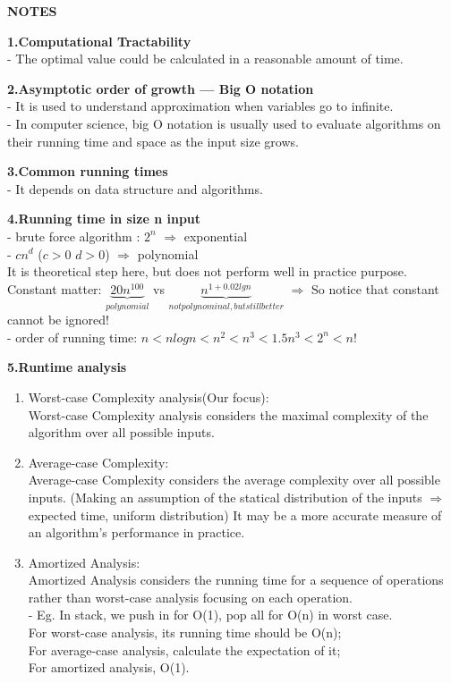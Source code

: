 \setlength{\parindent}{4em}
\setlength{\parskip}{1em}
\renewcommand{\baselinestretch}{1}
 
\textbf{NOTES}

\textbf{1.Computational Tractability} \\
- The optimal value could be calculated in a reasonable amount of time.

\textbf{2.Asymptotic order of growth --- Big O notation} \\
- It is used to understand approximation when variables go to infinite. \\
- In computer science, big O notation is usually used to evaluate algorithms on their running time and space as the input size grows.

\textbf{3.Common running times} \\
- It depends on data structure and algorithms.

\textbf{4.Running time in size n input} \\
- brute force algorithm : $2^{n}$ $\Rightarrow$ exponential \\
- $c n^{d}$ ($c>0$ $d>0$) $\Rightarrow$ polynomial\\
It is theoretical step here, but does not perform well in practice purpose. \\ 
Constant matter: $\underbrace{20 n^{100}}_{polynomial}$ vs $\underbrace{n^{1+0.02 lgn}}_{not polynominal, but still better}$ $\Rightarrow$ So notice that constant cannot be ignored! \\
- order of running time: $n<nlogn<n^{2}<n^{3}<1.5 n^{3}<2^{n}<n!$

\textbf{5.Runtime analysis}
\begin{enumerate}
\item 
Worst-case Complexity analysis(Our focus):\\
Worst-case Complexity analysis considers the maximal complexity of the algorithm over all possible inputs.
\item
Average-case Complexity: \\
Average-case Complexity considers the average complexity over all possible inputs. (Making an assumption of the statical distribution of the inputs $\Rightarrow$ expected time, uniform distribution) It may be a more accurate measure of an algorithm's performance in practice. 
\item
Amortized Analysis:\\
Amortized Analysis considers the running time for a sequence of operations rather than worst-case analysis focusing on each operation. \\

- Eg. In stack, we push in for O(1), pop all for O(n) in worst case.\\
For worst-case analysis, its running time should be O(n);\\
For average-case analysis, calculate the expectation of it; \\
For amortized analysis, O(1). 
\end{enumerate}


